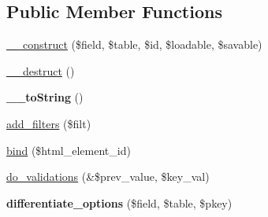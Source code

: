 \subsection*{\-Public \-Member \-Functions}
\begin{DoxyCompactItemize}
\item 
\hyperlink{class_ac_field_a1300e91fbc0a035f38420e52237dde1f}{\-\_\-\-\_\-construct} (\$field, \$table, \$id, \$loadable, \$savable)
\item 
\hyperlink{class_ac_field_a421831a265621325e1fdd19aace0c758}{\-\_\-\-\_\-destruct} ()
\item 
\hypertarget{class_ac_field_a7516ca30af0db3cdbf9a7739b48ce91d}{{\bfseries \-\_\-\-\_\-to\-String} ()}\label{class_ac_field_a7516ca30af0db3cdbf9a7739b48ce91d}

\item 
\hyperlink{class_ac_field_a461b02faf2faecfcfe23f73158612f3e}{add\-\_\-filters} (\$filt)
\item 
\hyperlink{class_ac_field_a08e160d0798c0ff194509d64414fb3af}{bind} (\$html\-\_\-element\-\_\-id)
\item 
\hyperlink{class_ac_field_a1b746968057818ec9d4142cf5d070fc4}{do\-\_\-validations} (\&\$prev\-\_\-value, \$key\-\_\-val)
\item 
\hypertarget{class_ac_field_a575b623f3ea83c31a1a21da53e39caed}{{\bfseries differentiate\-\_\-options} (\$field, \$table, \$pkey)}\label{class_ac_field_a575b623f3ea83c31a1a21da53e39caed}


\end{DoxyCompactItemize}
